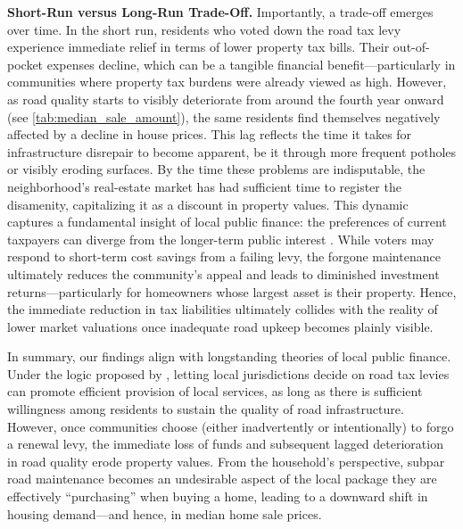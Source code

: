 {\bf Short-Run versus Long-Run Trade-Off.} Importantly, a trade-off emerges over time. In the short run, residents who voted down the road tax levy experience immediate relief in terms of lower property tax bills. Their out-of-pocket expenses decline, which can be a tangible financial benefit—particularly in communities where property tax burdens were already viewed as high. However, as road quality starts to visibly deteriorate from around the fourth year onward (see \ref{tab:median_sale_amount}), the same residents find themselves negatively affected by a decline in house prices. This lag reflects the time it takes for infrastructure disrepair to become apparent, be it through more frequent potholes or visibly eroding surfaces. By the time these problems are indisputable, the neighborhood’s real-estate market has had sufficient time to register the disamenity, capitalizing it as a discount in property values. This dynamic captures a fundamental insight of local public finance: the preferences of current taxpayers can diverge from the longer-term public interest \citep{BuchananTullock1962, AlesinaTabellini1990}. While voters may respond to short-term cost savings from a failing levy, the forgone maintenance ultimately reduces the community’s appeal and leads to diminished investment returns—particularly for homeowners whose largest asset is their property. Hence, the immediate reduction in tax liabilities ultimately collides with the reality of lower market valuations once inadequate road upkeep becomes plainly visible.


In summary, our findings align with longstanding theories of local public finance. Under the logic proposed by \cite{Oates1972}, letting local jurisdictions decide on road tax levies can promote efficient provision of local services, as long as there is sufficient willingness among residents to sustain the quality of road infrastructure. However, once communities choose (either inadvertently or intentionally) to forgo a renewal levy, the immediate loss of funds and subsequent lagged deterioration in road quality erode property values. From the household’s perspective, subpar road maintenance becomes an undesirable aspect of the local package they are effectively “purchasing” when buying a home, leading to a downward shift in housing demand—and hence, in median home sale prices.


